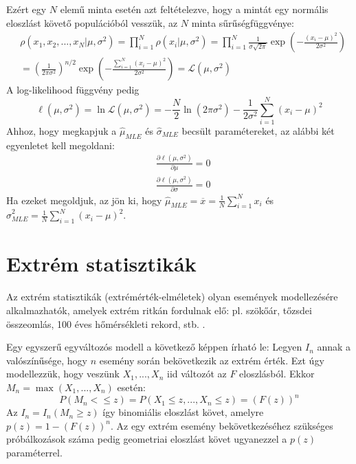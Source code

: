 \documentclass[12pt]{article}
\theoremstyle{plain}
\begin{document}
Ezért egy $N$ elemű minta esetén azt feltételezve, hogy a mintát egy normális eloszlást követő populációból vesszük, 
az $N$ minta sűrűségfüggvénye:
\begin{align*}
  &  \rho(x_1, x_2, ..., x_N | \mu, \sigma^2) = \prod\limits_{i=1}^{N} \rho(x_i|\mu, \sigma^2)
    = \prod\limits_{i=1}^{N} \frac{1}{\sigma\sqrt{2\pi}}\exp\left(-\frac{(x_i-\mu)^2}{2\sigma^2}\right) \\
  & = \left(\frac{1}{2\pi\sigma^2}\right)^{n/2} \exp\left(-\frac{\sum\limits_{i=1}^N(x_i-\mu)^2}{2\sigma^2}\right)
    = \mathcal L(\mu, \sigma^2)
\end{align*}
A log-likelihood függvény pedig
\begin{equation*}
    \ell(\mu, \sigma^2) = \ln \mathcal L(\mu, \sigma^2) =
    -\frac{N}{2}\ln(2\pi\sigma^2) - \frac{1}{2\sigma^2}\sum\limits_{i=1}^{N}(x_i-\mu)^2
\end{equation*}
Ahhoz, hogy megkapjuk a $\hat\mu_{MLE}$ és $\hat\sigma_{MLE}$ becsült paramétereket, az alábbi két egyenletet kell megoldani:
\begin{align*}
    & \frac{\partial \ell(\mu, \sigma^2)}{\partial \mu} = 0 \\
    & \frac{\partial \ell(\mu, \sigma^2)}{\partial \sigma} = 0
\end{align*}
Ha ezeket megoldjuk, az jön ki, hogy $\hat\mu_{MLE} = \overline{x} = \frac{1}{N}\sum\limits_{i=1}^{N}x_i$ és 
$\hat\sigma_{MLE}^2 = \frac{1}{N}\sum\limits_{i=1}^{N}(x_i-\mu)^2$.

\section{Extrém statisztikák}
Az extrém statisztikák (extrémérték-elméletek) olyan események modellezésére alkalmazhatók, amelyek extrém ritkán fordulnak elő: pl. szökőár,
tőzsdei összeomlás, 100 éves hőmérsékleti rekord, stb. \cite{extremestat}.

Egy egyszerű egyváltozós modell a következő képpen írható le: Legyen $I_n$ annak a valószínűsége, hogy $n$ esemény során
bekövetkezik az extrém érték. Ezt úgy modellezzük, hogy veszünk $X_1, ..., X_n$ iid változót az $F$ eloszlásból.
Ekkor $M_n = \max(X_1, ..., X_n)$ esetén:
\begin{equation*}
    P(M_n < \leq z) = P(X_1\leq z, ..., X_n\leq z) = (F(z))^n
\end{equation*}
Az $I_n = I_n(M_n\geq z)$ így binomiális eloszlást követ, amelyre $p(z) = 1-(F(z))^n$. Az egy extrém esemény bekövetkezéséhez 
szükséges próbálkozások száma pedig geometriai eloszlást követ ugyanezzel a $p(z)$ paraméterrel.\cite{extremestat_univariate}
\end{document}

